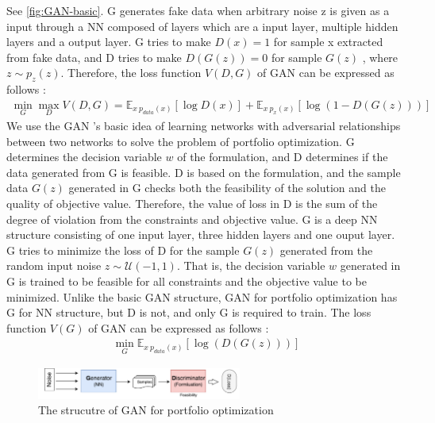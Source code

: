 \documentclass[11pt]{article}
\begin{document}
\begin{itemize}
See \ref{fig:GAN-basic}. G generates fake data when arbitrary noise z is given as a input through a NN composed of layers which are a input layer, multiple hidden layers and a output layer. G tries to make $D(x) = 1$ for sample x extracted from fake data, and D tries to make $D(G (z)) = 0$ for sample $G (z)$ , where $z \sim p_{z}(z)$. Therefore, the loss function $V(D,G)$ of GAN can be expressed as follows : %
 \begin{align*}
 \min_G \max_D V(D,G)  = \mathbb{E}_{x~p_{data}(x)}[\log D(x)]  + \mathbb{E}_{x~p_{x}(x)}[\log(1-D(G(z)))] 
 \end{align*}
 We use the GAN 's basic idea of learning networks with adversarial relationships between two networks to solve the problem of portfolio optimization. G determines the decision variable $w$ of the formulation, and D determines if the data generated from G is feasible. D is based on the formulation, and the sample data $G(z)$ generated in G checks both the feasibility of the solution and the quality of objective value. Therefore, the value of loss in D is the sum of the degree of violation from the constraints and objective value. G is a deep NN structure consisting of one input layer, three hidden layers and one ouput layer. G tries to minimize the loss of D for the sample $G(z)$ generated from the random input noise $z \sim \mathcal {U}(-1,1)$. That is, the decision variable $ w $ generated in G is trained to be feasible for all constraints and the objective value to be minimized. Unlike the basic GAN structure, GAN for portfolio optimization has G for NN structure, but D is not, and only G is required to train. The loss function $V(G)$ of GAN can be expressed as follows :
 \begin{align*}
 \min_G \mathbb{E}_{x~p_{data}(x)}[\log(D(G(z)))] 
 \end{align*}

\begin{figure}[h] 
	\begin{center}
		\includegraphics[width=0.6\textwidth]{GAN_port}
		\caption{The strucutre of GAN for portfolio optimization} \label{fig:GAN-port}
	\end{center}

\end{figure}
	

\end{itemize}
\end{document}
